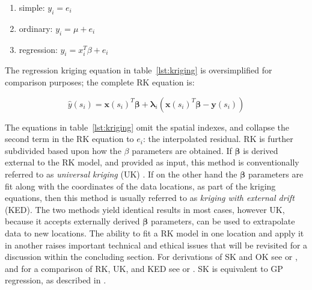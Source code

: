\documentclass[draft]{article}
\begin{document}
\begin{enumerate}\label{lst:kriging}
\item simple: $y_i = e_i$
\item ordinary: $y_i = \mu + e_i$
\item regression: $y_i = x_{i}^T \beta + e_i$
\end{enumerate}


The regression kriging equation in table~\ref{lst:kriging} is oversimplified for comparison purposes; the complete RK equation is:

\begin{equation} \label{eq:rk}
  \hat{y}(s_i) = \bm{x}(s_i)^T \bm{\beta} + \bm{\lambda}_i (\bm{x}(s_i)^T \bm{\beta} - \bm{y}(s_i))
\end{equation}

The equations in table~\ref{lst:kriging} omit the spatial indexes, and collapse the second term in the RK equation to $e_i$: the interpolated residual.  RK is further subdivided based upon how the $\beta$ parameters are obtained.  If $\bm{\beta}$ is derived external to the RK model, and provided as input, this method is conventionally referred to as {\em universal kriging} (UK) \cite{pebesma06, hengl07a}.  If on the other hand the $\bm{\beta}$ parameters are fit along with the coordinates of the data locations, as part of the kriging equations, then this method is usually referred to as {\em kriging with external drift} (KED).  The two methods yield identical results in most cases, however UK, because it accepts externally derived $\bm{\beta}$ parameters, can be used to extrapolate data to new locations.  The ability to fit a RK model in one location and apply it in another raises important technical and ethical issues that will be revisited for a discussion within the concluding section.  For derivations of SK and OK see \cite{wackernagel03a} or \cite{gotway97}, and for a comparison of RK, UK, and KED see \cite{hengl07a} or \cite{wackernagel03a}.  SK is equivalent to GP regression, as described in \cite{rasmussen06}.
\end{document}
